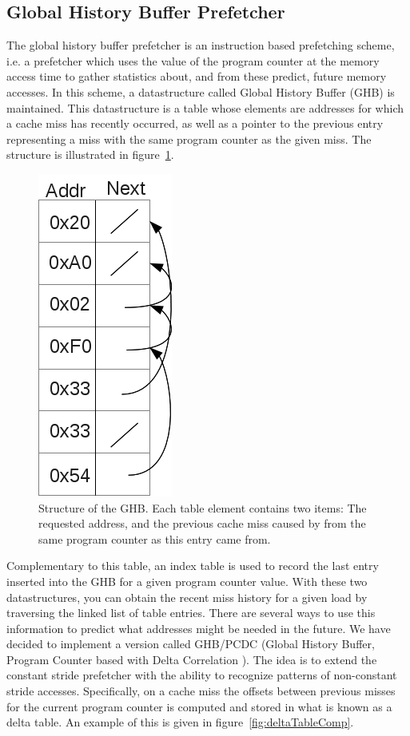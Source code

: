 \subsection{Global History Buffer Prefetcher}
\label{sec:ghbPcdcPrefetcher}

The global history buffer prefetcher is an instruction based
prefetching scheme, i.e. a prefetcher which uses the value of the
program counter at the memory access time to gather statistics about,
and from these predict, future memory accesses. In
this scheme, a datastructure called Global History Buffer (GHB) is maintained. This datastructure is a table whose elements are
addresses for which a cache miss has recently occurred, as well as a
pointer to the previous entry representing a miss
with the same program counter as the given miss. The
structure is illustrated in figure~\ref{fig:ghbStruct}.

\begin{figure}[ht]
  \centering
  \includegraphics[scale=0.5]{figures/ghb_diag.png}
  \caption{\label{fig:ghbStruct} Structure of the GHB. Each table
    element contains two items: The requested address, and the
    previous cache miss caused by from the same program counter as
    this entry came from.}
\end{figure}

Complementary to this table, an index table is used to record the last
entry inserted into the GHB for a given program counter value. With
these two datastructures, you can obtain the recent miss history for a
given load by traversing the linked list of table entries. There are
several ways to use this information to predict what addresses might
be needed in the future. We have decided to implement a version called
GHB/PCDC (Global History Buffer, Program Counter based with Delta
Correlation \cite{Grannas}). The idea is to extend the constant stride
prefetcher with the ability to recognize patterns of non-constant
stride accesses. Specifically, on a cache miss the offsets between
previous misses for the current program counter is computed and stored
in what is known as a delta table. An example of this is given in
figure~\ref{fig:deltaTableComp}. 

